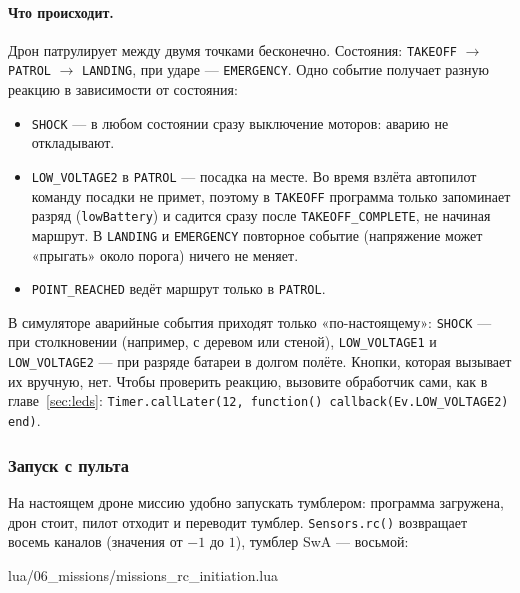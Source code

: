 \paragraph{Что происходит.} Дрон патрулирует между двумя точками бесконечно. Состояния: \verb|TAKEOFF| $\to$ \verb|PATROL| $\to$ \verb|LANDING|, при ударе --- \verb|EMERGENCY|. Одно событие получает разную реакцию в зависимости от состояния:
\begin{itemize}
    \item \verb|SHOCK| --- в любом состоянии сразу выключение моторов: аварию не откладывают.
    \item \verb|LOW_VOLTAGE2| в \verb|PATROL| --- посадка на месте. Во время взлёта автопилот команду посадки не примет, поэтому в \verb|TAKEOFF| программа только запоминает разряд (\verb|lowBattery|) и садится сразу после \verb|TAKEOFF_COMPLETE|, не начиная маршрут. В \verb|LANDING| и \verb|EMERGENCY| повторное событие (напряжение может «прыгать» около порога) ничего не меняет.
    \item \verb|POINT_REACHED| ведёт маршрут только в \verb|PATROL|.
\end{itemize}
В симуляторе аварийные события приходят только «по-настоящему»: \verb|SHOCK| --- при столкновении (например, с деревом или стеной), \verb|LOW_VOLTAGE1| и \verb|LOW_VOLTAGE2| --- при разряде батареи в долгом полёте. Кнопки, которая вызывает их вручную, нет. Чтобы проверить реакцию, вызовите обработчик сами, как в главе~\ref{sec:leds}: \texttt{Timer.callLater(12, function() callback(Ev.LOW\_VOLTAGE2) end)}.

\subsubsection*{Запуск с пульта}

На настоящем дроне миссию удобно запускать тумблером: программа загружена, дрон стоит, пилот отходит и переводит тумблер. \verb|Sensors.rc()| возвращает восемь каналов (значения от $-1$ до $1$), тумблер SwA --- восьмой:

\begin{codefile}{lua/06_missions/missions_rc_initiation.lua}
\end{codefile}

